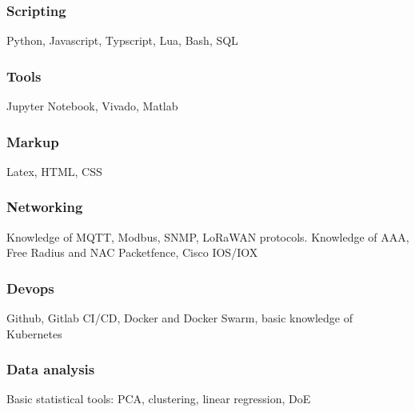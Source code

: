 \documentclass[11pt,a4paper]{article}
\begin{document}
\subsubsection{Scripting}
Python, Javascript, Typscript, Lua, Bash, SQL

\subsubsection{Tools}
Jupyter Notebook, Vivado, Matlab

\subsubsection{Markup}
Latex, HTML, CSS

\subsubsection{Networking}
Knowledge of MQTT, Modbus, SNMP, LoRaWAN protocols. Knowledge of AAA, Free Radius and NAC Packetfence, Cisco IOS/IOX

\subsubsection{Devops}
Github, Gitlab CI/CD, Docker and Docker Swarm, basic knowledge of Kubernetes

\subsubsection{Data analysis}
Basic statistical tools: PCA, clustering, linear regression, DoE
\end{document}
